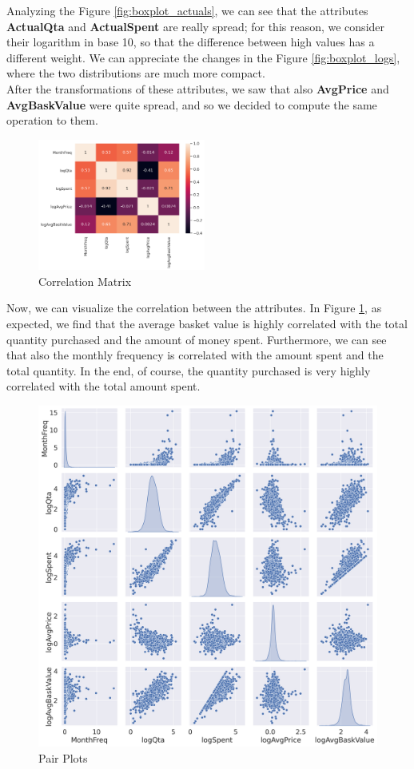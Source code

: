 Analyzing the Figure \ref{fig:boxplot_actuals}, we can see that the attributes \textbf{ActualQta} and \textbf{ActualSpent} are really spread; for this reason, we consider their logarithm in base 10, so that the difference between high values has a different weight. We can appreciate the changes in the Figure \ref{fig:boxplot_logs}, where the two distributions are much more compact.\\
After the transformations of these attributes, we saw that also \textbf{AvgPrice} and \textbf{AvgBaskValue} were quite spread, and so we decided to compute the same operation to them.

\pagebreak

\begin{figure}
\centering
\includegraphics[width=0.49\textwidth]{img/corr_logs.png}
\caption{Correlation Matrix}
\label{fig:corr_logs}
\end{figure}

Now, we can visualize the correlation between the attributes. In Figure \ref{fig:corr_logs}, as expected, we find that the average basket value is highly correlated with the total quantity purchased and the amount of money spent. Furthermore, we can see that also the monthly frequency is correlated with the amount spent and the total quantity. In the end, of course, the quantity purchased is very highly correlated with the total amount spent.

\vspace{10mm}

\begin{figure}
\centering
\captionsetup{justification=centering}
\includegraphics[width=.44\textwidth]{img/pairplot.png}
\caption{Pair Plots}
\label{fig:pairplot}
\end{figure}

